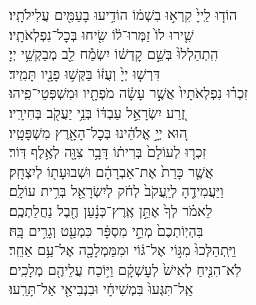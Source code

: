 \documentclass[twoside, openany, parskip=half, 11pt]{book}
\begin{document}
\begin{narrow}		
הוֹד֤וּ לַֽייָ֙ קִרְא֣וּ בִשְׁמ֔וֹ \hfill
 הוֹדִ֥יעוּ בָעַמִּ֖ים עֲלִילֹתָֽיו׃ \\
 שִׁ֤ירוּ לוֹ֙ זַמְּרוּ־ל֔וֹ \hfill שִׂ֖יחוּ בְּכׇל־נִפְלְאֹתָֽיו׃ \\
 הִֽתְהַלְלוּ֙ בְּשֵׁ֣ם קׇדְשׁ֔וֹ \hfill יִשְׂמַ֕ח לֵ֖ב מְבַקְשֵׁ֥י יְיָ׃ \\
 דִּרְשׁ֤וּ יְיָ֙ וְעֻזּ֔וֹ \hfill בַּקְּשׁ֥וּ פָנָ֖יו תָּמִֽיד׃ \\
 זִכְר֗וּ נִפְלְאֹתָיו֙ אֲשֶׁ֣ר עָשָׂ֔ה \hfill מֹפְתָ֖יו וּמִשְׁפְּטֵי־פִֽיהוּ׃ \\
 זֶ֚רַע יִשְׂרָאֵ֣ל עַבְדּ֔וֹ \hfill בְּנֵ֥י יַעֲקֹ֖ב בְּחִירָֽיו׃ \\
 ה֚וּא יְיָ֣ אֱלֹהֵ֔ינוּ \hfill בְּכׇל־הָאָ֖רֶץ מִשְׁפָּטָֽיו׃ \\
 זִכְר֤וּ לְעוֹלָם֙ בְּרִית֔וֹ \hfill דָּבָ֥ר צִוָּ֖ה לְאֶ֥לֶף דּֽוֹר׃ \\
 אֲשֶׁ֤ר כָּרַת֙ אֶת־אַבְרָהָ֔ם \hfill וּשְׁבוּעָת֖וֹ לְיִצְחָֽק׃ \\
 וַיַּעֲמִידֶ֤הָ לְיַֽעֲקֹב֙ לְחֹ֔ק \hfill לְיִשְׂרָאֵ֖ל בְּרִ֥ית עוֹלָֽם׃ \\
 לֵאמֹ֗ר לְךָ֙ אֶתֵּ֣ן אֶֽרֶץ־כְּנָ֔עַן \hfill חֶ֖בֶל נַחֲלַתְכֶֽם׃ \\
 בִּהְיֽוֹתְכֶם֙ מְתֵ֣י מִסְפָּ֔ר \hfill כִּמְעַ֖ט וְגָרִ֥ים בָּֽהּ׃ \\
 וַיִּֽתְהַלְּכוּ֙ מִגּ֣וֹי אֶל־גּ֔וֹי \hfill וּמִמַּמְלָכָ֖ה אֶל־עַ֥ם אַחֵֽר׃ \\
 לֹֽא־הִנִּ֤יחַ לְאִישׁ֙ לְעׇשְׁקָ֔ם \hfill וַיּ֥וֹכַח עֲלֵיהֶ֖ם מְלָכִֽים׃ \\
 אַֽל־תִּגְּעוּ֙ בִּמְשִׁיחָ֔י \hfill וּבִנְבִיאַ֖י אַל־תָּרֵֽעוּ׃ 
 

\end{narrow}
\end{document}
